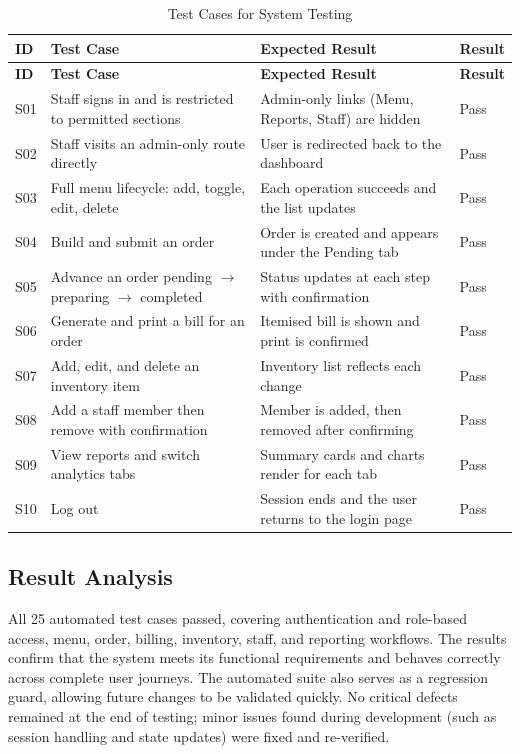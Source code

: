 \documentclass[12pt,a4paper]{report}
\begin{document}
\begin{longtable}{|p{1.2cm}|p{4.2cm}|p{4.4cm}|p{2.2cm}|}
\caption{Test Cases for System Testing}\label{tab:system}\\
\hline
\textbf{ID} & \textbf{Test Case} & \textbf{Expected Result} & \textbf{Result} \\ \hline
\endfirsthead
\hline
\textbf{ID} & \textbf{Test Case} & \textbf{Expected Result} & \textbf{Result} \\ \hline
\endhead
\hline
\endfoot
S01 & Staff signs in and is restricted to permitted sections & Admin-only links (Menu, Reports, Staff) are hidden & Pass \\ \hline
S02 & Staff visits an admin-only route directly & User is redirected back to the dashboard & Pass \\ \hline
S03 & Full menu lifecycle: add, toggle, edit, delete & Each operation succeeds and the list updates & Pass \\ \hline
S04 & Build and submit an order & Order is created and appears under the Pending tab & Pass \\ \hline
S05 & Advance an order pending $\rightarrow$ preparing $\rightarrow$ completed & Status updates at each step with confirmation & Pass \\ \hline
S06 & Generate and print a bill for an order & Itemised bill is shown and print is confirmed & Pass \\ \hline
S07 & Add, edit, and delete an inventory item & Inventory list reflects each change & Pass \\ \hline
S08 & Add a staff member then remove with confirmation & Member is added, then removed after confirming & Pass \\ \hline
S09 & View reports and switch analytics tabs & Summary cards and charts render for each tab & Pass \\ \hline
S10 & Log out & Session ends and the user returns to the login page & Pass \\ \hline
\end{longtable}

\subsection{Result Analysis}
All 25 automated test cases passed, covering authentication and role-based access, menu, order,
billing, inventory, staff, and reporting workflows. The results confirm that the system meets
its functional requirements and behaves correctly across complete user journeys. The automated
suite also serves as a regression guard, allowing future changes to be validated quickly. No
critical defects remained at the end of testing; minor issues found during development (such as
session handling and state updates) were fixed and re-verified.
\end{document}
